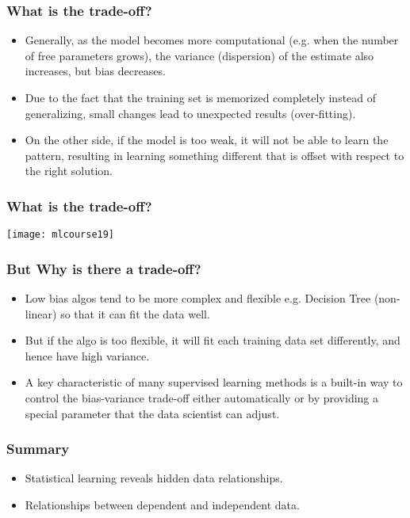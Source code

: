 \begin{frame}[fragile]\frametitle{What is the trade-off?}
\begin{itemize}
\item Generally, as the model becomes more computational (e.g. when the number of free parameters grows), the variance (dispersion) of the estimate also increases, but bias decreases. 
\item Due to the fact that the training set is memorized completely instead of generalizing, small changes lead to unexpected results (over-fitting). 
\item On the other side, if the model is too weak, it will not be able to learn the pattern, resulting in learning something different that is offset with respect to the right solution.

\end{itemize}
\end{frame}

\begin{frame}[fragile]\frametitle{What is the trade-off?}
\begin{center}
\texttt{[image: mlcourse19]}
\end{center}	
\end{frame}

\begin{frame}[fragile]\frametitle{But Why is there a trade-off?}
\begin{itemize}
\item Low bias algos tend to be more complex and flexible e.g. Decision Tree (non-linear) so that it can fit the data well. 
\item But if the algo is too flexible, it will fit each training data set differently, and hence have high variance.
\item A key characteristic of many supervised learning methods is a built-in way to control the bias-variance trade-off either automatically or by providing a special parameter that the data scientist can adjust.

\end{itemize}
\end{frame}

\begin{frame}[fragile]\frametitle{Summary}
\begin{itemize}
\item Statistical learning reveals hidden data relationships. 
\item Relationships between  dependent and  independent data.
\end{itemize}
\end{frame}

